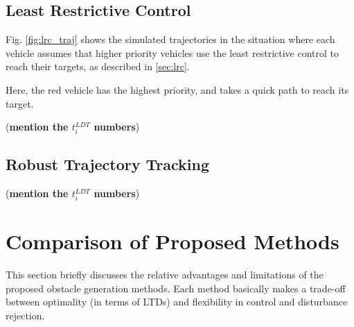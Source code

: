\subsection{Least Restrictive Control}
Fig. \ref{fig:lrc_traj} shows the simulated trajectories in the situation where each vehicle assumes that higher priority vehicles use the least restrictive control to reach their targets, as described in \ref{sec:lrc}. 

Here, the red vehicle has the highest priority, and takes a quick path to reach its target. 



(\textbf{mention the $t_i^{LDT}$ numbers})

\subsection{Robust Trajectory Tracking}
%
(\textbf{mention the $t_i^{LDT}$ numbers})

\section{Comparison of Proposed Methods}
This section briefly discusses the relative advantages and limitations of the proposed obstacle generation methods. Each method basically makes a trade-off between optimality (in terms of LTDs) and flexibility in control and disturbance rejection.

